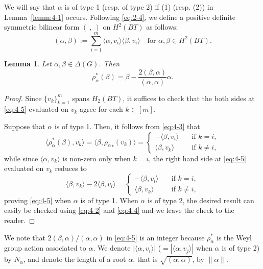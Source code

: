 \documentclass[12pt]{amsart}
\theoremstyle{plain} \numberwithin{equation}{section}
\newtheorem{lemm}[theo]{Lemma}
\theoremstyle{definition}
\def\RG{\Delta(G)}
\begin{document}
We will say that $\alpha$ is of type 1 (resp. of type 2) if (1) (resp. (2)) in Lemma~\ref{lemm:4-1} occurs. 
Following \eqref{eq:2-4}, we define a positive definite symmetric bilinear form $(\ ,\ )$ on $H^2(BT)$ as follows:
\begin{equation} 
(\alpha,\beta):=\sum_{i=1}^m \langle \alpha, v_i\rangle\langle \beta,v_i\rangle\quad\text{for $\alpha,\beta\in H^2(BT)$}.
\end{equation}


\begin{lemm} \label{lemm:4-2}
Let $\alpha, \beta\in \RG$.  Then 
\begin{equation} \label{eq:4-5}
\rho_\alpha^*(\beta)=\beta-\frac{2(\beta,\alpha)}{(\alpha,\alpha)}\alpha.
\end{equation}
\end{lemm}

\begin{proof}
Since $\{v_k\}_{k=1}^m$ spans $H_2(BT)$, it suffices to check that the both sides at \eqref{eq:4-5} evaluated on $v_k$ agree for each $k\in [m]$.  

Suppose that $\alpha$ is of type 1. Then, it follows from \eqref{eq:4-3} that
\[
\langle \rho_\alpha^*(\beta),v_k\rangle=\langle\beta,{\rho_\alpha}_*(v_k)\rangle= \begin{cases} -\langle\beta,v_i\rangle \quad&\text{if $k=i$},\\
\langle\beta,v_k\rangle\quad&\text{if $k\not=i$},\end{cases}
\]
while since $\langle \alpha,v_k\rangle$ is non-zero only when $k=i$, the right hand side at \eqref{eq:4-5} evaluated on $v_k$ reduces to 
\[
\langle\beta,v_k\rangle-2\langle\beta,v_i\rangle= \begin{cases} -\langle\beta,v_i\rangle \quad&\text{if $k=i$},\\
\langle\beta,v_k\rangle\quad&\text{if $k\not=i$},\end{cases}
\]
proving \eqref{eq:4-5} when $\alpha$ is of type 1. 
When $\alpha$ is of type 2, the desired result can easily be checked using \eqref{eq:4-2} and \eqref{eq:4-4} and we leave the check to the reader.  
\end{proof}

We note that $2(\beta,\alpha)/(\alpha,\alpha)$ in \eqref{eq:4-5} is an integer because $\rho_\alpha^*$ is the Weyl group action associated to $\alpha$.  We denote $|\langle\alpha,v_i\rangle|$ ($=|\langle\alpha,v_j\rangle|$ when $\alpha$ is of type 2) by $N_\alpha$, and denote the length of a root $\alpha$, that is $\sqrt{(\alpha,\alpha)}$, by $\|\alpha\|$.  
\end{document}
